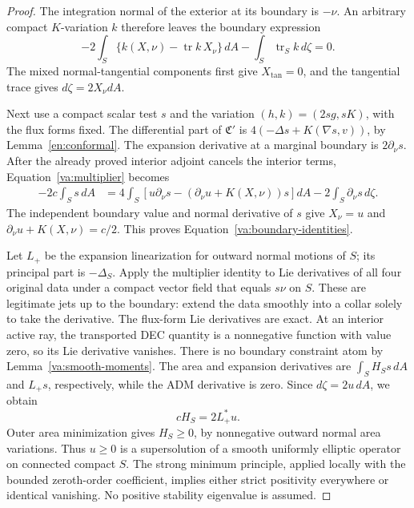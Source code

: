 \begin{proof}
The integration normal of the exterior at its boundary is \(-\nu\).
An arbitrary compact \(K\)-variation \(k\) therefore leaves the
boundary expression
\[
 -2\int_S\{k(X,\nu)-\operatorname{tr}k\,X_\nu\}\,dA
                         -\int_S\operatorname{tr}_S k\,d\zeta=0.
\]
The mixed normal-tangential components first give \(X_{\mathrm{tan}}=0\),
and the tangential trace gives \(d\zeta=2X_\nu dA\).

Next use a compact scalar test \(s\) and the variation
\((h,k)=(2sg,sK)\), with the flux forms fixed.  The differential
part of \(\mathfrak C'\) is
\(4(-\Delta s+K(\nabla s,v))\), by
Lemma~\ref{en:conformal}.  The expansion derivative at a marginal
boundary is \(2\partial_\nu s\).  After the already proved interior
adjoint cancels the interior terms, Equation~\eqref{va:multiplier}
becomes
\begin{align*}
 -2c\int_Ss\,dA
 &=4\int_S\left[u\partial_\nu s
               -(\partial_\nu u+K(X,\nu))s\right]dA
                         -2\int_S\partial_\nu s\,d\zeta.
\end{align*}
The independent boundary value and normal derivative of \(s\) give
\(X_\nu=u\) and \(\partial_\nu u+K(X,\nu)=c/2\).
This proves Equation~\eqref{va:boundary-identities}.

Let \(L_+\) be the expansion linearization for outward normal motions
of \(S\); its principal part is \(-\Delta_S\).  Apply the multiplier
identity to Lie derivatives of all four original data under a compact
vector field that equals \(s\nu\) on \(S\).  These are legitimate
jets up to the boundary: extend the data smoothly into a collar solely
to take the derivative.  The flux-form Lie derivatives are exact.
At an interior active ray, the transported DEC quantity is a
nonnegative function with value zero, so its Lie derivative vanishes.
There is no boundary constraint atom by
Lemma~\ref{va:smooth-moments}.  The area and expansion derivatives are
\(\int_SH_Ss\,dA\) and \(L_+s\), respectively, while the ADM
derivative is zero.  Since \(d\zeta=2u\,dA\), we obtain
\begin{equation}\label{va:boundary-stability-identity}
 cH_S=2L_+^*u.
\end{equation}
Outer area minimization gives \(H_S\ge0\), by nonnegative outward
normal area variations.  Thus \(u\ge0\) is a supersolution of a
smooth uniformly elliptic operator on connected compact \(S\).
The strong minimum principle, applied locally with the bounded
zeroth-order coefficient, implies either strict positivity everywhere
or identical vanishing.  No positive stability eigenvalue is assumed.


\end{proof}
